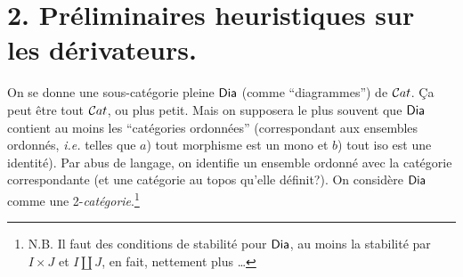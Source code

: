 \section*{2. Préliminaires heuristiques sur les dérivateurs.}

On se donne une sous-catégorie pleine $\mathsf{Dia}$ (comme “diagrammes”) de $\mathcal{C}at$. Ça peut être tout $\mathcal{C}at$, ou plus petit. Mais on supposera le plus souvent que $\mathsf{Dia}$ contient au moins les “catégories ordonnées” (correspondant aux ensembles ordonnés, \textit{i.e.} telles que $a$) tout morphisme est un mono et $b$) tout iso est une identité). Par abus de langage, on identifie un ensemble ordonné avec la catégorie correspondante (et une catégorie au topos qu'elle définit?). On considère $\mathsf{Dia}$ comme une 2-\textit{catégorie}.\footnote{N.B. Il faut des conditions de stabilité pour $\mathsf{Dia}$, au moins la stabilité par $I \times J$ et $I \amalg J$, en fait, nettement plus \dots}


